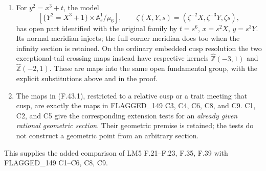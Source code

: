 \begin{proposition}
\begin{enumerate}
\item For $y^2=x^3+t$, the model
\[
 [\{Y^2=X^3+1\}\times\mathbb A^1_s/\mu_6],\qquad
 \zeta(X,Y,s)=(\zeta^{-2}X,\zeta^{-3}Y,\zeta s),
 \tag{F.43.3}
\]
has open part identified with the original family by
$t=s^6$, $x=s^2X$, $y=s^3Y$. Its normal meridian injects;
the full corner meridian does too when the infinity section
is retained. On the ordinary embedded cusp resolution the
two exceptional-tail crossing maps instead have respective
kernels $\widehat{\mathbb Z}(-3,1)$ and
$\widehat{\mathbb Z}(-2,1)$. These are maps into the same
open fundamental group, with the explicit substitutions above
and in the proof.

\item The maps in (F.43.1), restricted to a relative cusp or a
trait meeting that cusp, are exactly the maps in FLAGGED\_149
C3, C4, C6, C8, and C9. C1, C2, and C5 give the corresponding
extension tests for an \emph{already given rational geometric
section}. Their geometric premise is retained; the tests do not
construct a geometric point from an arbitrary section.
\end{enumerate}
This supplies the added comparison of LM5 F.21--F.23, F.35,
F.39 with FLAGGED\_149 C1--C6, C8, C9.
\end{proposition}
